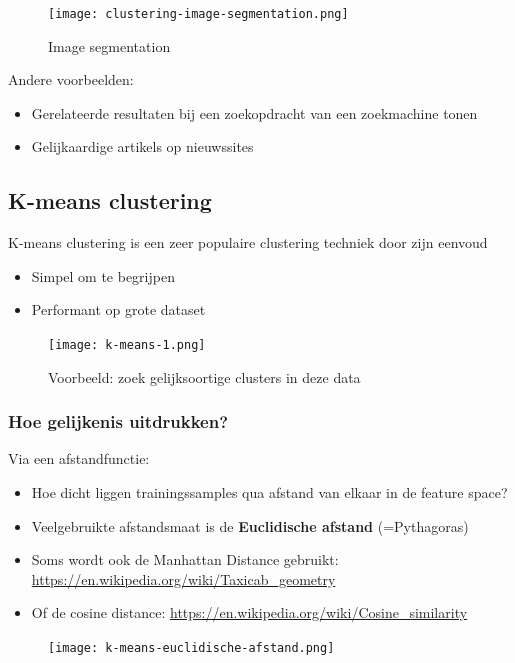 \documentclass{article}
\begin{document}
\begin{figure}[H]
    \centering
    \texttt{[image: clustering-image-segmentation.png]}
    \caption{Image segmentation}
\end{figure}


Andere voorbeelden:

\begin{itemize}
    \item Gerelateerde resultaten bij een zoekopdracht van een zoekmachine tonen
    \item Gelijkaardige artikels op nieuwssites
\end{itemize}

\subsection{K-means clustering}

K-means clustering is een zeer populaire clustering techniek door zijn eenvoud

\begin{itemize}
    \item Simpel om te begrijpen
    \item Performant op grote dataset
\end{itemize}

\begin{figure}[H]
    \centering
    \texttt{[image: k-means-1.png]}
    \caption{Voorbeeld: zoek gelijksoortige clusters in deze data}
\end{figure}

\subsubsection{Hoe gelijkenis uitdrukken?}

Via een afstandfunctie:

\begin{itemize}
    \item Hoe dicht liggen trainingssamples qua afstand van elkaar in de feature space?
    \item Veelgebruikte afstandsmaat is de \textbf{Euclidische afstand} (=Pythagoras)
    \item Soms wordt ook de Manhattan Distance gebruikt: \url{https://en.wikipedia.org/wiki/Taxicab_geometry}
    \item Of de cosine distance: \url{https://en.wikipedia.org/wiki/Cosine_similarity}
\end{itemize}

\begin{figure}[H]
    \centering
    \texttt{[image: k-means-euclidische-afstand.png]}
\end{figure}
\end{document}
